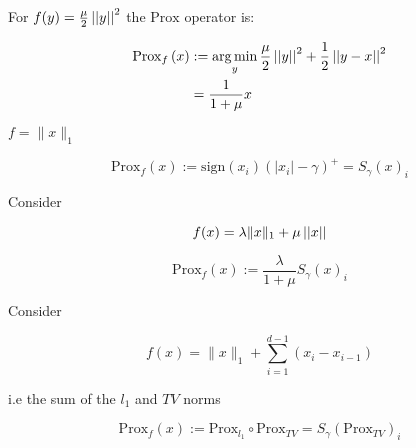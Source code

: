 \begin{example}[\(l_2\) norm]
For \(f(y) = \frac{\mu}{2}\left|\left|y\right|\right|^2\) the \(\mathrm{Prox}\) operator is:

\begin{align}
\mathrm{Prox}_f\left(x\right) &:=  \operatorname*{arg\,min}_y \frac{\mu}{2}\left|\left|y\right|\right|^2 + \frac{1}{2}\left|\left|y-x\right|\right|^2 \\
& = \frac{1}{1+\mu}x
\end{align}
\end{example}

\begin{example}[\(l_1\) norm]
\(f = \|x\|_1\)

\begin{equation}
\mathrm{Prox}_f\left(x\right) := \mathrm{sign}(x_i)\left(|x_i| - \gamma\right)^+ = S_\gamma\left(x\right)_i 
\end{equation}
\end{example}

\begin{example}
Consider

\begin{equation}
f(x) = \lambda\|x\|_1 + \mu \left|\left|x\right|\right| 
\end{equation}

\begin{equation}
\mathrm{Prox}_f\left(x\right) := \frac{\lambda}{1+\mu} S_\gamma\left(x\right)_i 
\end{equation}
\end{example}

\begin{example}
Consider

\begin{equation}
f(x) = \|x\|_1 + \sum_{i=1}^{d-1} \left( x_i - x_{i-1} \right) 
\end{equation}

i.e the sum of the \(l_1\) and \(TV\) norms

\begin{equation}
\mathrm{Prox}_f\left(x\right) := \mathrm{Prox}_{l_1} \circ \mathrm{Prox}_{TV} =  S_\gamma\left(\mathrm{Prox}_{TV}\right)_i 
\end{equation}
\end{example}

